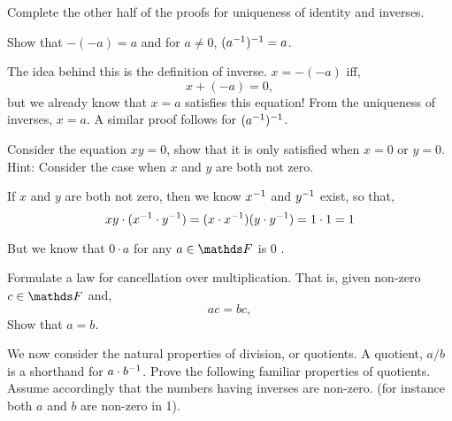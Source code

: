 \begin{exc}
\begin{exercise}[points=1]
    Complete the other half of the proofs for uniqueness of identity and inverses.
\end{exercise}

\begin{exercise}
    Show that \(-(-a) = a\) and for \(a \ne 0\), \((a^{-1})^{-1} = a\).
\end{exercise}

\begin{solution}
    The idea behind this is the definition of inverse. \(x = -(-a)\) iff, 
    \begin{equation*}
        x + (-a) = 0,
    \end{equation*}
    but we already know that \(x = a\) satisfies this equation! From the uniqueness of 
    inverses, \(x = a\). A similar proof follows for \((a^{-1})^{-1}\).
\end{solution}

\begin{exercise}
    Consider the equation \(xy = 0\), show that it is only satisfied when \(x = 0\) or 
    \(y = 0\). Hint: Consider the case when \(x\) and \(y\) are both not zero.
\end{exercise}

\begin{solution}
    If \(x\) and \(y\) are both not zero, then we know \(x^{-1}\) and \(y^{-1}\) exist, so that,
    \begin{equation*}
        xy \cdot (x\inv \cdot y\inv) = (x\cdot x\inv)(y \cdot y\inv) = 1 \cdot 1 = 1 
    \end{equation*}

    But we know that \(0 \cdot a\) for any \(a \in \FF\) is \(0\) \lightning.
\end{solution}

\begin{exercise}
    Formulate a law for cancellation over multiplication. That is, given non-zero \(c \in \FF\) and, 
    \begin{equation*}
        ac = bc,
    \end{equation*}
    Show that \(a = b\).
\end{exercise}

\begin{exercise}
    We now consider the natural properties of division, or quotients. A quotient, \(a/b\) 
    is a shorthand for \(a \cdot b\inv\). Prove the following familiar properties of 
    quotients. Assume accordingly that the numbers having inverses are non-zero. (for instance 
    both \(a\) and \(b\) are non-zero in 1).
    

\end{exercise}
\end{exc}
